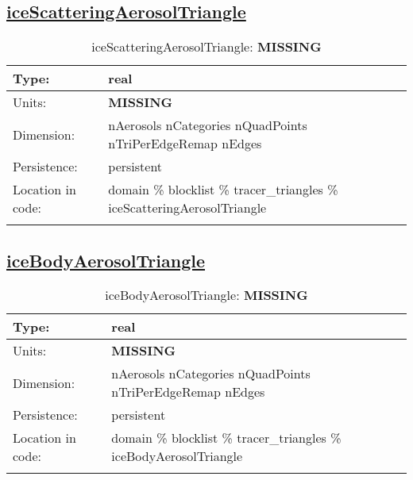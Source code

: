 \subsection[iceScatteringAerosolTriangle]{\hyperref[sec:var_tab_tracer_triangles]{iceScatteringAerosolTriangle}}
\label{subsec:var_sec_tracer_triangles_iceScatteringAerosolTriangle}
\begin{center}
\begin{longtable}{| p{2.0in} | p{4.0in} |}
        \hline 
        Type: & real \\
        \hline 
        Units: & {\bf \color{red} MISSING} \\
        \hline 
        Dimension: & nAerosols nCategories nQuadPoints nTriPerEdgeRemap nEdges \\
        \hline 
        Persistence: & persistent \\
        \hline 
         Location in code: & domain \% blocklist \% tracer\_triangles \% iceScatteringAerosolTriangle \\
         \hline 
    \caption{iceScatteringAerosolTriangle: {\bf \color{red} MISSING}}
\end{longtable}
\end{center}
\subsection[iceBodyAerosolTriangle]{\hyperref[sec:var_tab_tracer_triangles]{iceBodyAerosolTriangle}}
\label{subsec:var_sec_tracer_triangles_iceBodyAerosolTriangle}
\begin{center}
\begin{longtable}{| p{2.0in} | p{4.0in} |}
        \hline 
        Type: & real \\
        \hline 
        Units: & {\bf \color{red} MISSING} \\
        \hline 
        Dimension: & nAerosols nCategories nQuadPoints nTriPerEdgeRemap nEdges \\
        \hline 
        Persistence: & persistent \\
        \hline 
         Location in code: & domain \% blocklist \% tracer\_triangles \% iceBodyAerosolTriangle \\
         \hline 
    \caption{iceBodyAerosolTriangle: {\bf \color{red} MISSING}}
\end{longtable}
\end{center}
